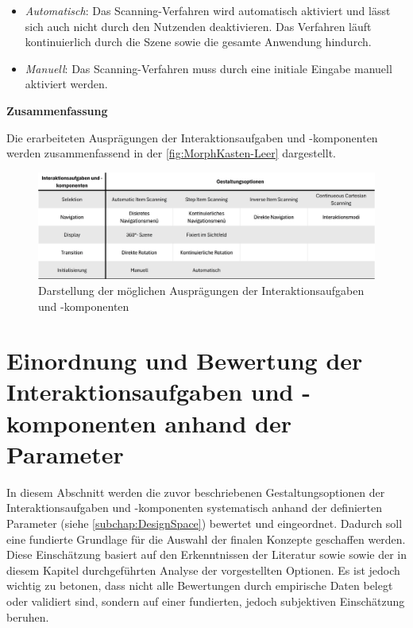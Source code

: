 \begin{itemize}
    \item \textit{Automatisch}: Das Scanning-Verfahren wird automatisch aktiviert und lässt sich auch nicht durch den Nutzenden deaktivieren. Das Verfahren läuft kontinuierlich durch die Szene sowie die gesamte Anwendung hindurch.
    \item \textit{Manuell}: Das Scanning-Verfahren muss durch eine initiale Eingabe manuell aktiviert werden. 
\end{itemize}

{\normalfont \bfseries Zusammenfassung}

Die erarbeiteten Ausprägungen der Interaktionsaufgaben und -komponenten werden zusammenfassend in der \autoref{fig:MorphKasten-Leer} dargestellt. 

\begin{figure}[tbh]
    \centering
    \includegraphics[width=1.0\textwidth]{images/MorphKasten-Ausgang2.png}
    \caption{Darstellung der möglichen Ausprägungen der Interaktionsaufgaben und -komponenten}
    \label{fig:MorphKasten-Leer}
\end{figure}

\section{Einordnung und Bewertung der Interaktionsaufgaben und -komponenten anhand der Parameter}
\label{subchap:EinordnungNachParameter}

In diesem Abschnitt werden die zuvor beschriebenen Gestaltungsoptionen der Interaktionsaufgaben und -komponenten systematisch anhand der definierten Parameter (siehe \autoref{subchap:DesignSpace}) bewertet und eingeordnet. Dadurch soll eine fundierte Grundlage für die Auswahl der finalen Konzepte geschaffen werden. Diese Einschätzung basiert auf den Erkenntnissen der Literatur sowie sowie der in diesem Kapitel durchgeführten Analyse der vorgestellten Optionen. Es ist jedoch wichtig zu betonen, dass nicht alle Bewertungen durch empirische Daten belegt oder validiert sind, sondern auf einer fundierten, jedoch subjektiven Einschätzung beruhen. 

